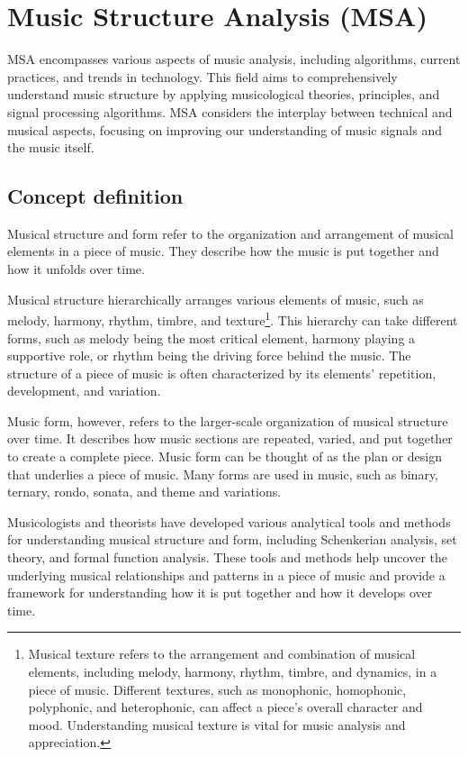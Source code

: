\chapter{Music Structure Analysis (MSA)}

MSA encompasses various aspects of music analysis, including algorithms, current practices, and trends in technology. This field aims to comprehensively understand music structure by applying musicological theories, principles, and signal processing algorithms. MSA considers the interplay between technical and musical aspects, focusing on improving our understanding of music signals and the music itself.

\section{Concept definition}

Musical structure and form refer to the organization and arrangement of musical elements in a piece of music. They describe how the music is put together and how it unfolds over time.

Musical structure hierarchically arranges various elements of music, such as melody, harmony, rhythm, timbre, and texture\footnote{Musical texture refers to the arrangement and combination of musical elements, including melody, harmony, rhythm, timbre, and dynamics, in a piece of music. Different textures, such as monophonic, homophonic, polyphonic, and heterophonic, can affect a piece's overall character and mood. Understanding musical texture is vital for music analysis and appreciation.}. This hierarchy can take different forms, such as melody being the most critical element, harmony playing a supportive role, or rhythm being the driving force behind the music. The structure of a piece of music is often characterized by its elements' repetition, development, and variation.

Music form, however, refers to the larger-scale organization of musical structure over time. It describes how music sections are repeated, varied, and put together to create a complete piece. Music form can be thought of as the plan or design that underlies a piece of music. Many forms are used in music, such as binary, ternary, rondo, sonata, and theme and variations.

Musicologists and theorists have developed various analytical tools and methods for understanding musical structure and form, including Schenkerian analysis, set theory, and formal function analysis. These tools and methods help uncover the underlying musical relationships and patterns in a piece of music and provide a framework for understanding how it is put together and how it develops over time.

